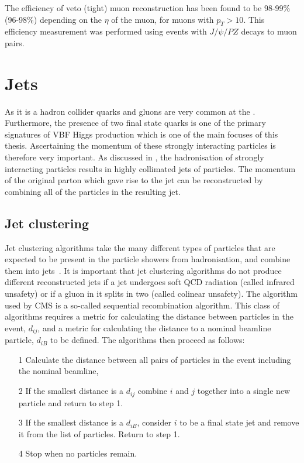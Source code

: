 The efficiency of veto (tight) muon reconstruction has been found to be 98-99\% (96-98\%) depending on the $\eta$ of the muon, for muons with $p_{T}>10$\GeV. This efficiency measurement was performed using events with $J/\psi/PZ$ decays to muon pairs.

\section{Jets}
\label{sec:jets}
As it is a hadron collider quarks and gluons are very common at the \LHC. Furthermore, the presence of two final state quarks is one of the primary signatures of \ac{VBF} Higgs production which is one of the main focuses of this thesis. Ascertaining the momentum of these strongly interacting particles is therefore very important. As discussed in , the hadronisation of strongly interacting particles results in highly collimated jets of particles. The momentum of the original parton which gave rise to the jet can be reconstructed by combining all of the particles in the resulting jet.


\subsection{Jet clustering}
\label{sec:jetclustering}
Jet clustering algorithms take the many different types of particles that are expected to be present in the particle showers from hadronisation, and combine them into jets~\cite{Salam:2009jx}. It is important that jet clustering algorithms do not produce different reconstructed jets if a jet undergoes soft QCD radiation (called infrared unsafety) or if a gluon in it splits in two (called colinear unsafety). The algorithm used by CMS is a so-called sequential recombination algorithm. This class of algorithms requires a metric for calculating the distance between particles in the event, $d_{ij}$, and a metric for calculating the distance to a nominal beamline particle, $d_{iB}$ to be defined. The algorithms then proceed as follows:
\begin{itemize}
\item[1] Calculate the distance between all pairs of particles in the event including the nominal beamline,
\item[2] If the smallest distance is a $d_{ij}$ combine $i$ and $j$ together into a single new particle and return to step 1.
\item[3] If the smallest distance is a $d_{iB}$, consider $i$ to be a final state jet and remove it from the list of particles. Return to step 1.
\item[4] Stop when no particles remain.
\end{itemize}

